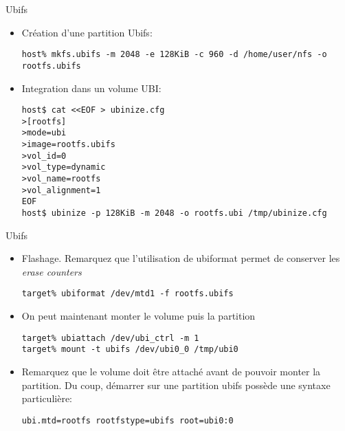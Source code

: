 \begin{frame}[fragile=singleslide]{Ubifs}
  \begin{itemize}
  \item Création d'une partition Ubifs:
    \begin{lstlisting}
host% mkfs.ubifs -m 2048 -e 128KiB -c 960 -d /home/user/nfs -o rootfs.ubifs
     \end{lstlisting}
  \item Integration dans un volume UBI:
    \begin{lstlisting}
host$ cat <<EOF > ubinize.cfg
>[rootfs]
>mode=ubi
>image=rootfs.ubifs
>vol_id=0
>vol_type=dynamic
>vol_name=rootfs
>vol_alignment=1
EOF
host$ ubinize -p 128KiB -m 2048 -o rootfs.ubi /tmp/ubinize.cfg
     \end{lstlisting}
  \end{itemize}
\end{frame}

\begin{frame}[fragile=singleslide]{Ubifs}
  \begin{itemize}
  \item Flashage. Remarquez que l'utilisation de ubiformat permet de conserver les \emph{erase counters}
    \begin{lstlisting}
target% ubiformat /dev/mtd1 -f rootfs.ubifs
     \end{lstlisting}
  \item On peut maintenant monter le volume puis la partition
    \begin{lstlisting}
target% ubiattach /dev/ubi_ctrl -m 1
target% mount -t ubifs /dev/ubi0_0 /tmp/ubi0
     \end{lstlisting}
     \item Remarquez que le volume doit être attaché avant de pouvoir monter la partition. Du coup, démarrer sur une partition ubifs possède une syntaxe particulière:
    \begin{lstlisting}
ubi.mtd=rootfs rootfstype=ubifs root=ubi0:0
     \end{lstlisting}
  \end{itemize}
\end{frame}



